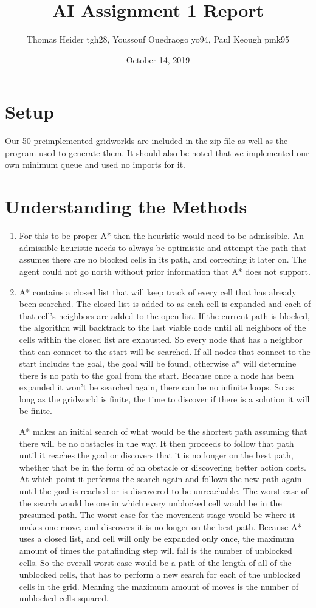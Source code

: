 \documentclass{article}
\title{AI Assignment 1 Report}
\author{Thomas Heider tgh28, Youssouf Ouedraogo yo94, Paul Keough pmk95}
\date{October 14, 2019}
\begin{document}
\maketitle

\section{Setup}
Our 50 preimplemented gridworlds are included in the zip file as well as the program used to generate them. It should also be noted that we implemented our own minimum queue and used no imports for it.
\section{Understanding the Methods}
\renewcommand{\theenumi}{\alph{enumi}}
\begin{enumerate}
    \setlength{\parindent}{10ex}
    \item For this to be proper A* then the heuristic would need to be admissible. An admissible heuristic needs to always be optimistic and attempt the path that assumes there are no blocked cells in its path, and correcting it later on. The agent could not go north without prior information that A* does not support. 
    \item A* contains a closed list that will keep track of every cell that has already been searched. The closed list is added to as each cell is expanded and each of that cell’s neighbors are added to the open list. If the current path is blocked, the algorithm will backtrack to the last viable node until all neighbors of the cells within the closed list are exhausted. So every node that has a neighbor that can connect to the start will be searched. If all nodes that connect to the start includes the goal, the goal will be found, otherwise a* will determine there is no path to the goal from the start. Because once a node has been expanded it won’t be searched again, there can be no infinite loops. So as long as the gridworld is finite, the time to discover if there is a solution it will be finite. \par
    A* makes an initial search of what would be the shortest path assuming that there will be no obstacles in the way. It then proceeds to follow that path until it reaches the goal or discovers that it is no longer on the best path, whether that be in the form of an obstacle or discovering better action costs. At which point it performs the search again and follows the new path again until the goal is reached or is discovered to be unreachable. The worst case of the search would be one in which every unblocked cell would be in the presumed path. The worst case for the movement stage would be where it makes one move, and discovers it is no longer on the best path. Because A* uses a closed list, and cell will only be expanded only once, the maximum amount of times the pathfinding step will fail is the number of unblocked cells. So the overall worst case would be a path of the length of all of the unblocked cells, that has to perform a new search for each of the unblocked cells in the grid. Meaning the maximum amount of moves is the number of unblocked cells squared. 
\end{enumerate}
\end{document}
